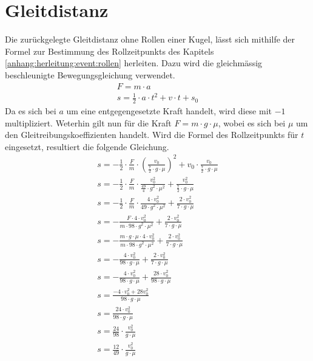 \section{Gleitdistanz}\label{anhang:herleitung:gleitdistanz}
Die zurückgelegte Gleitdistanz ohne Rollen einer Kugel, lässt sich mithilfe der Formel zur Bestimmung des Rollzeitpunkts
des Kapitels \ref{anhang:herleitung:event:rollen} herleiten.
Dazu wird die gleichmässig beschleunigte Bewegungsgleichung verwendet.
\begin{align}
    F = m \cdot a\\
    s = \frac{1}{2} \cdot a \cdot t^2 + v \cdot t + s_0
\end{align}
Da es sich bei $a$ um eine entgegengesetzte Kraft handelt, wird diese mit $-1$ multipliziert. Weterhin gilt nun für die
Kraft $F = m \cdot g \cdot \mu$, wobei es sich bei $\mu$ um den Gleitreibungskoeffizienten handelt. Wird die Formel des Rollzeitpunkts
für $t$ eingesetzt, resultiert die folgende Gleichung.
\begin{align}
    s = -\frac{1}{2} \cdot \frac{F}{m} \cdot (\frac{v_0}{\frac{7}{2} \cdot g \cdot \mu})^2 + v_0 \cdot \frac{v_0}{\frac{7}{2} \cdot g \cdot \mu}\\
    s = -\frac{1}{2} \cdot \frac{F}{m} \cdot \frac{v_0^2}{\frac{49}{4} \cdot g^2 \cdot \mu^2} + \frac{v_0^2}{\frac{7}{2} \cdot g \cdot \mu}\\
    s = -\frac{1}{2} \cdot \frac{F}{m} \cdot \frac{4 \cdot v_0^2}{49 \cdot g^2 \cdot \mu^2} + \frac{2 \cdot v_0^2}{7 \cdot g \cdot \mu}\\
    s = -\frac{F \cdot 4 \cdot v_0^2}{m \cdot 98 \cdot g^2 \cdot \mu^2} + \frac{2 \cdot v_0^2}{7 \cdot g \cdot \mu}\\
    s = -\frac{m \cdot g \cdot \mu \cdot 4 \cdot v_0^2}{m \cdot 98 \cdot g^2 \cdot \mu^2} + \frac{2 \cdot v_0^2}{7 \cdot g \cdot \mu}\\
    s = -\frac{4 \cdot v_0^2}{98 \cdot g \cdot \mu} + \frac{2 \cdot v_0^2}{7 \cdot g \cdot \mu}\\
    s = -\frac{4 \cdot v_0^2}{98 \cdot g \cdot \mu} + \frac{28 \cdot v_0^2}{98 \cdot g \cdot \mu}\\
    s = \frac{-4 \cdot v_0^2 + 28 v_0^2}{98 \cdot g \cdot \mu}\\
    s = \frac{24 \cdot v_0^2}{98 \cdot g \cdot \mu}\\
    s = \frac{24}{98} \cdot \frac{v_0^2}{g \cdot \mu}\\
    s = \frac{12}{49} \cdot \frac{v_0^2}{g \cdot \mu}
\end{align}
